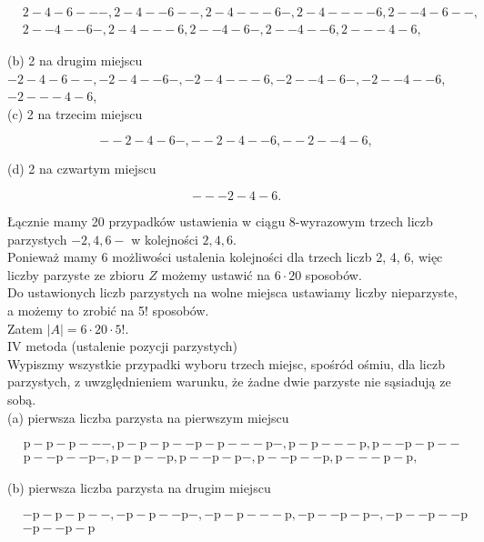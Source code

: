 \documentclass[10pt]{article}
\begin{document}
$$
\begin{aligned}
& 2-4-6---, 2-4--6--, 2-4---6-, 2-4----6,2--4-6--, \\
& 2--4--6-, 2-4---6,2--4-6-, 2--4--6,2---4-6,
\end{aligned}
$$

(b) 2 na drugim miejscu\\
$-2-4-6--,-2-4--6-,-2-4---6,-2--4-6-,-2--4--6$, $-2---4-6$,\\
(c) 2 na trzecim miejscu

$$
--2-4-6-,--2-4--6,--2--4-6,
$$

(d) 2 na czwartym miejscu

$$
---2-4-6 .
$$

Łącznie mamy 20 przypadków ustawienia w ciągu 8-wyrazowym trzech liczb parzystych $-2,4,6-$ w kolejności $2,4,6$.\\
Ponieważ mamy 6 możliwości ustalenia kolejności dla trzech liczb 2, 4, 6, więc liczby parzyste ze zbioru $Z$ możemy ustawić na $6 \cdot 20$ sposobów.\\
Do ustawionych liczb parzystych na wolne miejsca ustawiamy liczby nieparzyste, a możemy to zrobić na 5! sposobów.\\
Zatem $|A|=6 \cdot 20 \cdot 5!$.\\
IV metoda (ustalenie pozycji parzystych)\\
Wypiszmy wszystkie przypadki wyboru trzech miejsc, spośród ośmiu, dla liczb parzystych, z uwzględnieniem warunku, że żadne dwie parzyste nie sąsiadują ze sobą.\\
(a) pierwsza liczba parzysta na pierwszym miejscu

$$
\begin{aligned}
& \mathrm{p}-\mathrm{p}-\mathrm{p}---, \mathrm{p}-\mathrm{p}-\mathrm{p}--\mathrm{p}-\mathrm{p}---\mathrm{p}-, \mathrm{p}-\mathrm{p}---\mathrm{p}, \mathrm{p}--\mathrm{p}-\mathrm{p}-- \\
& \mathrm{p}--\mathrm{p}--\mathrm{p}-, \mathrm{p}-\mathrm{p}--\mathrm{p}, \mathrm{p}--\mathrm{p}-\mathrm{p}-, \mathrm{p}--\mathrm{p}--\mathrm{p}, \mathrm{p}---\mathrm{p}-\mathrm{p},
\end{aligned}
$$

(b) pierwsza liczba parzysta na drugim miejscu

$$
\begin{aligned}
& -\mathrm{p}-\mathrm{p}-\mathrm{p}--,-\mathrm{p}-\mathrm{p}--\mathrm{p}-,-\mathrm{p}-\mathrm{p}---\mathrm{p},-\mathrm{p}--\mathrm{p}-\mathrm{p}-,-\mathrm{p}--\mathrm{p}--\mathrm{p} \\
& -\mathrm{p}--\mathrm{p}-\mathrm{p}
\end{aligned}
$$
\end{document}

